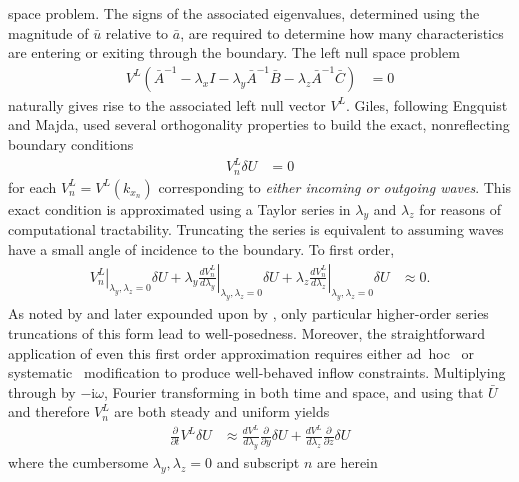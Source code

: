 \documentclass[letterpaper,11pt,nointlimits,reqno,draft]{amsbook}
\newcommand{\ii}{\ensuremath{\mathrm{i}}}
\begin{document}
space problem.  The signs of the associated eigenvalues, determined using the
magnitude of $\bar{u}$ relative to $\bar{a}$, are required to determine how
many characteristics are entering or exiting through the boundary.  The left
null space problem
\begin{align}
\label{eq:dimeulereigenprob}
  V^{L}
  \left(   \bar{A}^{-1}
         - \lambda_x I
         - \lambda_y \bar{A}^{-1} \bar{B}
         - \lambda_z \bar{A}^{-1} \bar{C}
  \right) &= 0
\end{align}
naturally gives rise to the associated left null vector $V^L$.  Giles,
following Engquist and Majda, used several orthogonality properties to build
the exact, nonreflecting boundary conditions
\begin{align}
\label{eq:dimeulerexact}
  V_n^L \delta{}U &= 0
\end{align}
for each $V_n^L = V^L\!\left(k_{x_n}\right)$ corresponding to \textit{either
incoming or outgoing waves}.  This exact condition is approximated using a
Taylor series in $\lambda_y$ and $\lambda_z$ for reasons of computational
tractability.  Truncating the series is equivalent to assuming waves have a
small angle of incidence to the boundary.  To first order,
\begin{align}
  \left.V_n^L\right|_{\lambda_y,\lambda_z=0}
  \delta{}U
  +
  \lambda_y
  \left.\frac{dV_n^L}{d\lambda_y}\right|_{\lambda_y,\lambda_z=0}
  \delta{}U
  +
  \lambda_z
  \left.\frac{dV_n^L}{d\lambda_z}\right|_{\lambda_y,\lambda_z=0}
  \delta{}U
  &\approx 0
  .
\end{align}
As noted by \citet{Engquist1977Absorbing} and later expounded upon by
\citet{Trefethen1986Wellposedness}, only particular higher-order series
truncations of this form lead to well-posedness.  Moreover, the straightforward
application of even this first order approximation requires either
ad~hoc~\citep{Giles1988Nonreflecting,Medida2007} or
systematic~\citep{Rowley2000Discretely} modification to produce well-behaved
inflow constraints.  Multiplying through by $-\ii\omega$, Fourier transforming
in both time and space, and using that $\bar{U}$ and therefore $V_n^L$ are both
steady and uniform yields
\begin{align}
\label{eq:dimeulerapprox}
  \frac{\partial}{\partial{}t}
  V^L
  \delta{}U
  &\approx
  \frac{dV^L}{d\lambda_y}
  \frac{\partial}{\partial{}y}\delta{}U
  +
  \frac{dV^L}{d\lambda_z}
  \frac{\partial}{\partial{}z}\delta{}U
\end{align}
where the cumbersome $\lambda_y,\lambda_z=0$ and subscript $n$ are herein
\end{document}

